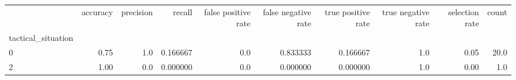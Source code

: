\begin{tabular}{lrrrrrrrrr}
\toprule
{} &  accuracy &  precision &    recall &  false positive rate &  false negative rate &  true positive rate &  true negative rate &  selection rate &  count \\
tactical\_situation &           &            &           &                      &                      &                     &                     &                 &        \\
\midrule
0                  &      0.75 &        1.0 &  0.166667 &                  0.0 &             0.833333 &            0.166667 &                 1.0 &            0.05 &   20.0 \\
2                  &      1.00 &        0.0 &  0.000000 &                  0.0 &             0.000000 &            0.000000 &                 1.0 &            0.00 &    1.0 \\
\bottomrule
\end{tabular}
